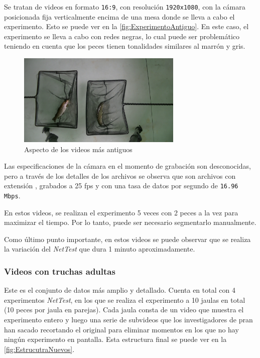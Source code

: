 Se tratan de videos en formato \texttt{16:9}, con resolución \texttt{1920x1080}, con la cámara posicionada fija verticalmente encima de una mesa donde se lleva a cabo el experimento. Esto se puede ver 
en la \autoref{fig:ExperimentoAntiguo}. En este caso, el experimento se lleva a cabo con redes negras, lo cual puede ser problemático teniendo en cuenta que los peces tienen 
tonalidades similares al marrón y gris.

\begin{figure}[h]
    \centering
    \includegraphics[width=0.70\textwidth]{images/3/ExperimentoAntiguo.png}
    \caption{Aspecto de los videos más antiguos}
    \label{fig:ExperimentoAntiguo}
\end{figure}

Las especificaciones de la cámara en el momento de grabación son desconocidas, pero a través de los detalles de los archivos se observa que son archivos con extensión 
\texttt{}, grabados a 25 \acrshort{fps} y con una tasa de datos por segundo de \texttt{16.96 Mbps}.

En estos videos, se realizan el experimento 5 veces con 2 peces a la vez para maximizar el tiempo. Por lo tanto, puede ser necesario segmentarlo manualmente.

Como último punto importante, en estos videos se puede observar que se realiza la variación del \textit{NetTest} que dura 1 minuto aproximadamente.

\subsubsection*{Videos con truchas adultas}

Este es el conjunto de datos más amplio y detallado. Cuenta en total con 4 experimentos \textit{NetTest}, en los que se realiza el experimento a 10 jaulas en total (10 peces por jaula en parejas). 
Cada jaula consta de un  video que muestra el experimento entero y luego una serie de subvideos que los investigadores de \acrshort{pran} han sacado recortando el original para eliminar 
momentos en los que no hay ningún experimento en pantalla. Esta estructura final se puede ver en la \autoref{fig:EstrucutraNuevos}.

